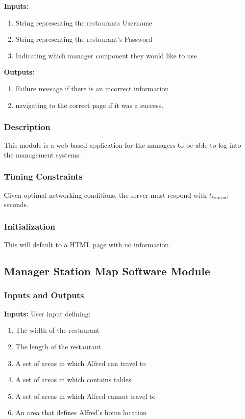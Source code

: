 \documentclass [10pt]{article}
\begin{document}
\textbf{Inputs: } 
\begin{enumerate}
	\item String representing the restaurants Username
	\item String representing the restaurant's Password
	\item Indicating which manager component they would like to use
\end{enumerate}

\textbf{Outputs: } 
\begin{enumerate}
	\item Failure message if there is an incorrect information
	\item navigating to the correct page if it was a success.
\end{enumerate}

\subsubsection{Description}
This module is a web based application for the managers to be able to log into the management systems.
\subsubsection{Timing Constraints}
Given optimal networking conditions, the server must respond with $ t_{timeout} $ seconds.

\subsubsection{Initialization}
This will default to a HTML page with no information.


\subsection{Manager Station Map Software Module}

\subsubsection{Inputs and Outputs}

\textbf{Inputs: } User input defining:
\begin{enumerate}
	\item The width of the restaurant
	\item The length of the restaurant
	\item A set of areas in which Alfred can travel to
	\item A set of areas in which contains tables
	\item A set of areas in which Alfred cannot travel to
	\item An area that defines Alfred's home location
\end{enumerate}
\end{document}
